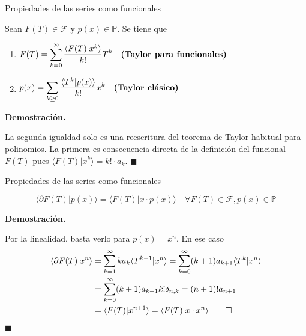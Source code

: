 \documentclass{beamer}
\newenvironment{proposicion}[1][]{
  \begin{tcolorbox}[colback=darkred!10, colframe=darkred!70, title=Proposición\ #1, fonttitle=\bfseries]
}{
  \end{tcolorbox}
}
\newenvironment{demo}{%
  \par\medskip\noindent\textbf{Demostración.}\hspace{0.5em}%
}{%
  \hfill$\blacksquare$\par\medskip%
}
\newcommand{\F}{\mathscr{F}} %
\newcommand{\poly}{\mathbb{P}} %
\begin{document}
  \begin{frame}{Propiedades de las series como funcionales}
    \begin{proposicion}[(desarrollos de Taylor)]
    Sean $F(T) \in \F$ y $p(x) \in \poly$. Se tiene que
    \begin{enumerate}
        \item $\begin{aligned}[t]
            F(T) = \sum_{k = 0}^\infty \frac{ \langle F(T) | x^k \rangle}{k!}T^k \quad \text{\textbf{(Taylor para funcionales)}}
        \end{aligned}$ 
        \item $\begin{aligned}
            p(x) = \sum_{k \geq 0} \frac{ \langle T^k| p(x) \rangle}{k!}x^k \quad \text{\textbf{(Taylor clásico)}}
        \end{aligned}$
    \end{enumerate}
  \end{proposicion}

  \begin{demo}
    La segunda igualdad solo es una reescritura del teorema de Taylor habitual para polinomios. La primera es consecuencia directa de la definición del funcional $F(T)$ pues $\langle F(T) | x^k\rangle = k! \cdot a_k$.
  \end{demo}
\end{frame}

\begin{frame}{Propiedades de las series como funcionales}
  \begin{proposicion}[(adjunción de derivada formal)]
      \begin{equation*}
        \langle \partial F(T) | p(x) \rangle = \langle F(T) | x \cdot p(x)\rangle \quad \forall F(T) \in \F, p(x) \in \poly
      \end{equation*}
    \end{proposicion}
    \begin{demo}
      Por la linealidad, basta verlo para $p(x) = x^n$. En ese caso 
        \begin{align*}
            \langle \partial F(T)| x^n\rangle & = \sum_{k=1}^\infty ka_k\langle T^{k-1}| x^n\rangle = \sum_{k=0}^\infty (k+1)a_{k+1}\langle T^{k}| x^n\rangle \\
            & = \sum_{k=0}^\infty (k+1)a_{k+1}k! \delta_{n,k} = (n+1)!a_{n+1}\\ 
            & = \langle F(T)| x^{n+1}\rangle = \langle F(T)| x\cdot x^n\rangle \qedhere
        \end{align*}
    \end{demo}
\end{frame}
\end{document}
